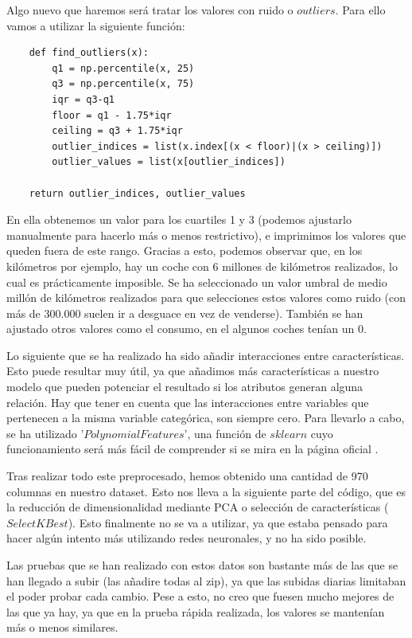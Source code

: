 \documentclass[11pt,a4paper]{article}
\begin{document}
Algo nuevo que haremos será tratar los valores con ruido o $outliers$. Para ello vamos a utilizar la siguiente función:

\begin{lstlisting}
    def find_outliers(x):
        q1 = np.percentile(x, 25)
        q3 = np.percentile(x, 75)
        iqr = q3-q1
        floor = q1 - 1.75*iqr
        ceiling = q3 + 1.75*iqr
        outlier_indices = list(x.index[(x < floor)|(x > ceiling)])
        outlier_values = list(x[outlier_indices])

    return outlier_indices, outlier_values
\end{lstlisting}

En ella obtenemos un valor para los cuartiles 1 y 3 (podemos ajustarlo manualmente para hacerlo más o menos restrictivo), e
imprimimos los valores que queden fuera de este rango. Gracias a esto, podemos observar que, en los kilómetros por ejemplo, hay
un coche con 6 millones de kilómetros realizados, lo cual es prácticamente imposible. Se ha seleccionado un valor umbral de medio
millón de kilómetros realizados para que selecciones estos valores como ruido (con más de 300.000 suelen ir a desguace en vez de
venderse). También se han ajustado otros valores como el consumo, en el algunos coches tenían un 0.

Lo siguiente que se ha realizado ha sido añadir interacciones entre características. Esto puede resultar muy útil, ya que añadimos
más características a nuestro modelo que pueden potenciar el resultado si los atributos generan alguna relación. Hay que tener en
cuenta que las interacciones entre variables que pertenecen a la misma variable categórica, son siempre cero. Para llevarlo a
cabo, se ha utilizado '$PolynomialFeatures$', una función de $sklearn$ cuyo funcionamiento será más fácil de comprender si se mira
en la página oficial \cite{bib:polynomialfeatures}.

Tras realizar todo este preprocesado, hemos obtenido una cantidad de 970 columnas en nuestro dataset. Esto nos lleva a la siguiente
parte del código, que es la reducción de dimensionalidad mediante PCA o selección de características ($SelectKBest$). Esto
finalmente no se va a utilizar, ya que estaba pensado para hacer algún intento más utilizando redes neuronales, y no ha sido
posible.

Las pruebas que se han realizado con estos datos son bastante más de las que se han llegado a subir (las añadire todas al zip), ya
que las subidas diarias limitaban el poder probar cada cambio. Pese a esto, no creo que fuesen mucho mejores de las que ya hay,
ya que en la prueba rápida realizada, los valores se mantenían más o menos similares.
\end{document}
